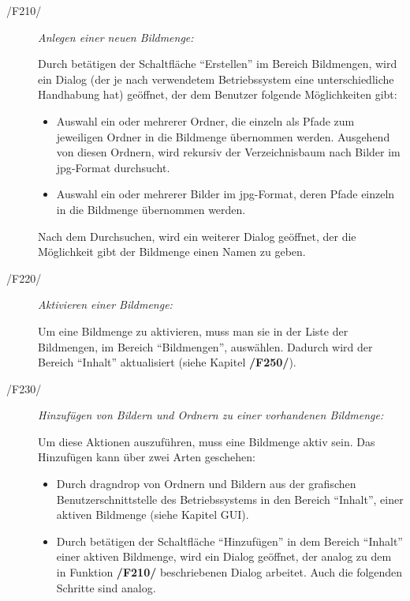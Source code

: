	\begin{description}
		
		\item[/F210/] \textit{Anlegen einer neuen Bildmenge:}\par Durch betätigen der Schaltfläche "`Erstellen"' im Bereich Bildmengen, wird ein Dialog (der je nach verwendetem Betriebssystem eine unterschiedliche Handhabung hat) geöffnet, der dem Benutzer folgende Möglichkeiten gibt:
			
			\begin{itemize}
			
				\item Auswahl ein oder mehrerer Ordner, die einzeln als Pfade zum jeweiligen Ordner in die Bildmenge übernommen werden. Ausgehend von diesen Ordnern, wird rekursiv der Verzeichnisbaum nach Bilder im \gls{jpg}-Format durchsucht.
				
				\item Auswahl ein oder mehrerer Bilder im \gls{jpg}-Format, deren Pfade einzeln in die Bildmenge übernommen werden.
			
			\end{itemize}
		
		Nach dem Durchsuchen, wird ein weiterer Dialog geöffnet, der die Möglichkeit gibt der Bildmenge einen Namen zu geben.
		
		\item[/F220/] \textit{Aktivieren einer Bildmenge:}\par Um eine Bildmenge zu aktivieren, muss man sie in der Liste der Bildmengen, im Bereich "`Bildmengen"', auswählen. Dadurch wird der Bereich "`Inhalt"' aktualisiert (siehe Kapitel \textbf{/F250/}).
		
		\item[/F230/] \textit{Hinzufügen von Bildern und Ordnern zu einer vorhandenen Bildmenge:}\par Um diese Aktionen auszuführen, muss eine Bildmenge aktiv sein. Das Hinzufügen kann über zwei Arten geschehen:
		
			\begin{itemize}
				
				\item Durch \gls{dragndrop} von Ordnern und Bildern aus der grafischen Benutzerschnittstelle des Betriebssystems in den Bereich "`Inhalt"', einer aktiven Bildmenge (siehe Kapitel GUI). 
				
				\item Durch betätigen der Schaltfläche "`Hinzufügen"' in dem Bereich "`Inhalt"' einer aktiven Bildmenge, wird ein Dialog geöffnet, der analog zu dem in Funktion \textbf{/F210/} beschriebenen Dialog arbeitet. Auch die folgenden Schritte sind analog.
			

\end{itemize}
\end{description}
